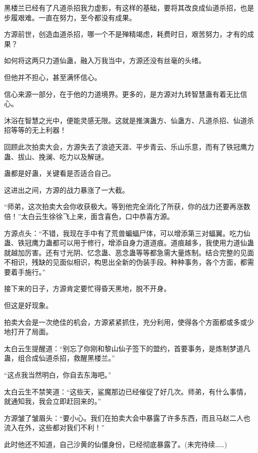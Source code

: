 \begin{this_body}
黑楼兰已经有了凡道杀招我力虚影，有这样的基础，要将其改良成仙道杀招，也是步履艰难。一直在努力，至今都没有成果。

方源前世，创造血道杀招，哪一个不是殚精竭虑，耗费时日，艰苦努力，才有的成果？

如何将这两只力道仙蛊，融入万我当中，方源还没有丝毫的头绪。

但他并不担心，甚至满怀信心。

信心来源一部分，在于他的力道境界。更多的，是方源对九转智慧蛊有着无比信心。

沐浴在智慧之光中，便能灵感无限。这就是推演蛊方、仙蛊方、凡道杀招、仙道杀招等等的无上利器！

回顾此次拍卖大会，方源失去了浪迹天涯、平步青云、乐山乐意，而有了铁冠鹰力蛊、拔山、挽澜、吃力以及解谜。

蛊都是好蛊，关键看是否适合自己。

这进出之间，方源的战力暴涨了一大截。

“师弟，这次拍卖大会你收获极大。等到他完全消化了所获，你的战力还要再涨数倍！”太白云生徐徐飞上来，面含喜色，口中恭喜方源。

方源点头：“不错，我现在手中有了荒兽蝙蝠尸体，可以增添第三对蝠翼。吃力仙蛊、铁冠鹰力蛊都可以用于修行，增添自身力道道痕。道痕越多，我使用力道仙蛊就越加厉害。还有寸光阴、忆念蛊、恶念蛊等等都急需大量炼制。结合完整的见面不相识，残缺的见面似相识，构思出全新的伪装手段。种种事务，各个方面，都需要着手施行。”

接下来的日子，方源肯定要忙得昏天黑地，脱不开身。

但这是好现象。

拍卖大会是一次绝佳的机会，方源紧紧抓住，充分利用，使得各个方面都或多或少地打开了局面。

太白云生提醒道：“别忘了你刚和黎山仙子签下的盟约，首要事务，是炼制梦道凡蛊，组合成仙道杀招，救醒黑楼兰。”

“这点我当然明白，你自去东海吧。”

太白云生不禁笑道：“这些天，鲨魔那边已经催促了好几次。师弟，有什么事情，就通知我，我会立即赶回来的。”

方源皱了皱眉头：“要小心。我们在拍卖大会中暴露了许多东西，而且马赵二人也流入在外，这些都对我们不利！”

此时他还不知道，自己沙黄的仙僵身份，已经彻底暴露了。(未完待续……)

\end{this_body}

